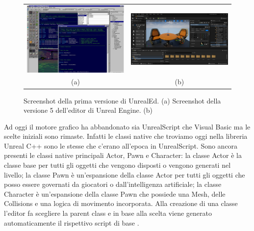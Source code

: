 \begin{figure}[h!] 
    \begin{center}
    \begin{tabular}{c @{\hspace{1em}} c}
    \includegraphics[width=6.5cm]{figure/UnrelEngineEditor1.jpg} &
    \includegraphics[width=6.5cm]{figure/01-level-editor-windows.png} \\
     (a) & (b)
    \end{tabular}
    \end{center}
    \caption{Screenshot della prima versione di UnrealEd. (a) Screenshot della versione 5 dell'editor di Unreal Engine. (b)} \label{fig:figura-doppia}
\end{figure}

Ad oggi il motore grafico ha abbandonato sia UnrealScript che Visual Basic ma le scelte iniziali sono rimaste.
%
Infatti le classi native che troviamo oggi nella libreria Unreal C++ sono le stesse che c'erano all'epoca in UnrealScript.
%
Sono ancora presenti le classi native principali Actor, Pawn e Character: la classe Actor è la classe base per tutti gli oggetti che vengono disposti o vengono generati nel livello; la classe Pawn è un'espansione della classe Actor per tutti gli oggetti che posso essere governati da giocatori o dall'intelligenza artificiale; la classe Character è un'espansione della classe Pawn che possiede una Mesh, delle Collisions e una logica di movimento incorporata. 
%
Alla creazione di una classe l'editor fa scegliere la parent class e in base alla scelta viene generato automaticamente il rispettivo script di base \cite{UProgrIntro}.


